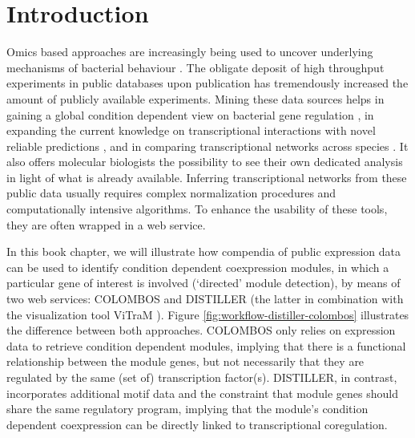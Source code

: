 
\section{Introduction}

Omics based approaches are increasingly being used to uncover underlying 
mechanisms of bacterial behaviour \cite{Fierro2008}. The obligate deposit of 
high throughput experiments in public databases upon publication has 
tremendously increased the amount of publicly available experiments. Mining 
these data sources helps in gaining a global condition dependent view on 
bacterial gene regulation \cite{Lemmens2009, Fadda2009}, in expanding the 
current knowledge on transcriptional interactions with novel reliable 
predictions \cite{Faith2007, Ernst2008}, and in comparing transcriptional 
networks across species \cite{Fierro2008, Babu2009}. It also offers molecular 
biologists the possibility to see their own dedicated analysis in light of what 
is already available. Inferring transcriptional networks from these public data 
usually requires complex normalization procedures \cite{Faith2008} and 
computationally intensive algorithms. To enhance the usability of these tools, 
they are often wrapped in a web service.

In this book chapter, we will illustrate how compendia of public expression 
data can be used to identify condition dependent coexpression modules, in which 
a particular gene of interest is involved (`directed' module detection), by 
means of two web services: COLOMBOS \cite{Engelen2011} and DISTILLER 
\cite{Lemmens2009} (the latter in combination with the visualization tool 
ViTraM \cite{Sun2009}). Figure \ref{fig:workflow-distiller-colombos}
illustrates the difference between both approaches. COLOMBOS only relies on 
expression data to retrieve condition dependent modules, implying that there is 
a functional relationship between the module genes, but not necessarily that 
they are regulated by the same (set of) transcription factor(s). DISTILLER, in 
contrast, incorporates additional motif data and the constraint that module 
genes should share the same regulatory program, implying that the module's 
condition dependent coexpression can be directly linked to transcriptional 
coregulation. 

